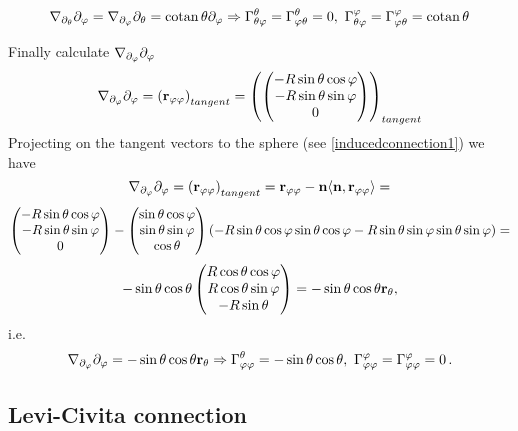 \documentclass[12pt]{article}
\theoremstyle{theorem}
\numberwithin{equation}{section}
\begin{document}
\begin{equation}\label{inducedonsphere8}
    \nabla_{\partial_\theta}\partial_\varphi=\nabla_{\partial_\varphi}\partial_\theta={\rm cotan\,}\theta  \partial_\varphi \Rightarrow
    \Gamma^\theta_{\theta\varphi}=\Gamma^\theta_{\varphi\theta}=0,\,\,
    \Gamma^\varphi_{\theta\varphi}=\Gamma^\varphi_{\varphi\theta}={\rm cotan\,}\theta
\end{equation}

Finally calculate $\nabla_{\partial_\varphi} \partial_\varphi$
                $$
            \nabla_{\partial_\varphi} \partial_\varphi=\left({\bf r}_{\varphi\varphi}\right)_{tangent}=
            \left(
            \begin{pmatrix}
            -R\sin\theta\cos\varphi\cr
            -R\sin\theta\sin\varphi\cr
            0\cr
                  \end{pmatrix}
                  \right)_{tangent}
                $$
Projecting on the tangent vectors to the sphere (see \eqref{inducedconnection1}) we have
     $$
\nabla_{\partial_\varphi} \partial_\varphi=\left({\bf r}_{\varphi\varphi}\right)_{tangent}=
{\bf r}_{\varphi\varphi}-{\bf n}\langle{\bf n},{\bf r}_{\varphi\varphi}\rangle=
         $$
         $$
     \begin{pmatrix}
            -R\sin\theta\cos\varphi\cr
            -R\sin\theta\sin\varphi\cr
            0\cr
                  \end{pmatrix}-
                  \begin{pmatrix}
            \sin\theta\cos\varphi\cr
            \sin\theta\sin\varphi\cr
            \cos\theta\cr
                  \end{pmatrix}\left(-R\sin\theta\cos\varphi\sin\theta\cos\varphi-
                  R\sin\theta\sin\varphi\sin\theta\sin\varphi\right)=
     $$
         $$
      -\sin\theta\cos\theta
      \begin{pmatrix}
            R\cos\theta\cos\varphi\cr
            R\cos\theta\sin\varphi\cr
            -R\sin\theta\cr
                  \end{pmatrix}=-\sin\theta\cos\theta{\bf r}_\theta,
         $$
i.e.
\begin{equation}\label{connectiononsphere12}
   \nabla_{\partial_\varphi}\partial_\varphi=-\sin\theta\cos\theta{\bf r}_\theta \Rightarrow
    \Gamma^\theta_{\varphi\varphi}=-\sin\theta\cos\theta,\,\,
    \Gamma^\varphi_{\varphi\varphi}=\Gamma^\varphi_{\varphi\varphi}=0\,.
\end{equation}


\subsection {Levi-Civita connection}
\end{document}
